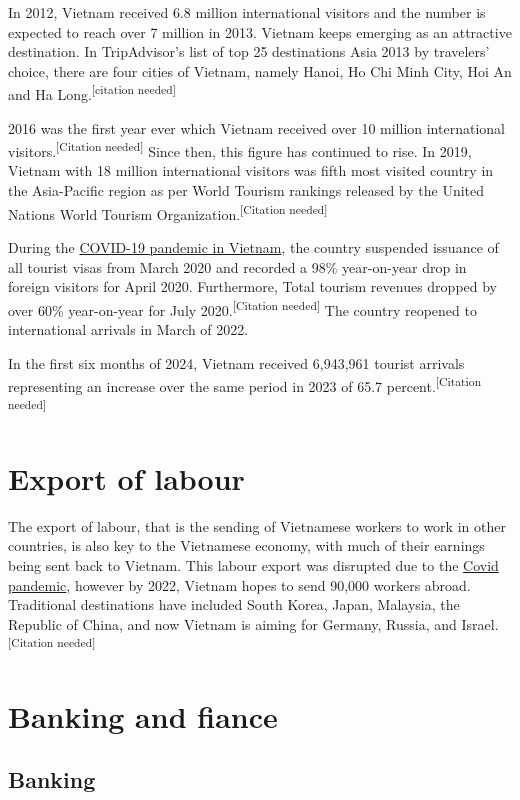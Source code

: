 \documentclass[openany]{book}
\begin{document}
In 2012, Vietnam received 6.8 million international visitors and the number is expected to reach over 7 million in 2013. Vietnam keeps emerging as an attractive destination. In TripAdvisor's list of top 25 destinations Asia 2013 by travelers' choice, there are four cities of Vietnam, namely Hanoi, Ho Chi Minh City, Hoi An and Ha Long.\textsuperscript{[citation needed]}

2016 was the first year ever which Vietnam received over 10 million international visitors.\textsuperscript{[Citation needed]} Since then, this figure has continued to rise. In 2019, Vietnam with 18 million international visitors was fifth most visited country in the Asia-Pacific region as per World Tourism rankings released by the United Nations World Tourism Organization.\textsuperscript{[Citation needed]}

During the \href{https://en.wikipedia.org/wiki/COVID-19_pandemic_in_Vietnam}{COVID-19 pandemic in Vietnam}, the country suspended issuance of all tourist visas from March 2020 and recorded a 98\% year-on-year drop in foreign visitors for April 2020. Furthermore, Total tourism revenues dropped by over 60\% year-on-year for July 2020.\textsuperscript{[Citation needed]} The country reopened to international arrivals in March of 2022.

In the first six months of 2024, Vietnam received 6,943,961 tourist arrivals representing an increase over the same period in 2023 of 65.7 percent.\textsuperscript{[Citation needed]}

\section{Export of labour}
The export of labour, that is the sending of Vietnamese workers to work in other countries, is also key to the Vietnamese economy, with much of their earnings being sent back to Vietnam. This labour export was disrupted due to the \href{https://en.wikipedia.org/wiki/COVID-19_pandemic}{Covid pandemic}, however by 2022, Vietnam hopes to send 90,000 workers abroad. Traditional destinations have included South Korea, Japan, Malaysia, the Republic of China, and now Vietnam is aiming for Germany, Russia, and Israel.\textsuperscript{[Citation needed]}
\clearpage
\section{Banking and fiance}
\subsection{Banking}
\end{document}
